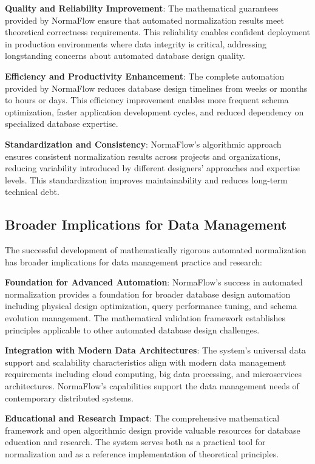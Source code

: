 \documentclass[acmsmall]{acmart}
\begin{document}
\textbf{Quality and Reliability Improvement}: The mathematical guarantees provided by NormaFlow ensure that automated normalization results meet theoretical correctness requirements. This reliability enables confident deployment in production environments where data integrity is critical, addressing longstanding concerns about automated database design quality.

\textbf{Efficiency and Productivity Enhancement}: The complete automation provided by NormaFlow reduces database design timelines from weeks or months to hours or days. This efficiency improvement enables more frequent schema optimization, faster application development cycles, and reduced dependency on specialized database expertise.

\textbf{Standardization and Consistency}: NormaFlow's algorithmic approach ensures consistent normalization results across projects and organizations, reducing variability introduced by different designers' approaches and expertise levels. This standardization improves maintainability and reduces long-term technical debt.

\subsection{Broader Implications for Data Management}

The successful development of mathematically rigorous automated normalization has broader implications for data management practice and research:

\textbf{Foundation for Advanced Automation}: NormaFlow's success in automated normalization provides a foundation for broader database design automation including physical design optimization, query performance tuning, and schema evolution management. The mathematical validation framework establishes principles applicable to other automated database design challenges.

\textbf{Integration with Modern Data Architectures}: The system's universal data support and scalability characteristics align with modern data management requirements including cloud computing, big data processing, and microservices architectures. NormaFlow's capabilities support the data management needs of contemporary distributed systems.

\textbf{Educational and Research Impact}: The comprehensive mathematical framework and open algorithmic design provide valuable resources for database education and research. The system serves both as a practical tool for normalization and as a reference implementation of theoretical principles.
\end{document}
